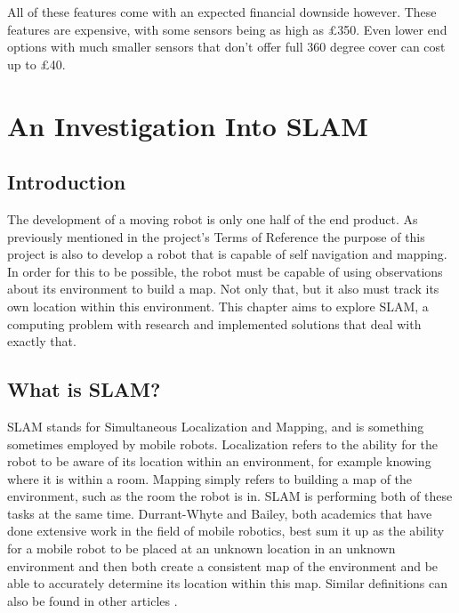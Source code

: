 				All of these features come with an expected financial downside however. These features are expensive, with some sensors being as high as \pounds{350}. Even lower end options with much smaller sensors that don't offer full 360 degree cover can cost up to \pounds{40}.
				
		
		\chapter{An Investigation Into SLAM}
			\section{Introduction}
			The development of a moving robot is only one half of the end product. As previously mentioned in the project's Terms of Reference the purpose of this project is also to develop a robot that is capable of self navigation and mapping. In order for this to be possible, the robot must be capable of using observations about its environment to build a map. Not only that, but it also must track its own location within this environment. This chapter aims to explore SLAM, a computing problem with research and implemented solutions that deal with exactly that.
		
			\section{What is SLAM?}
			SLAM stands for Simultaneous Localization and Mapping, and is something sometimes employed by mobile robots. Localization refers to the ability for the robot to be aware of its location within an environment, for example knowing where it is within a room. Mapping simply refers to building a map of the environment, such as the room the robot is in. SLAM is performing both of these tasks at the same time. Durrant-Whyte and Bailey\citep{durrant2006simultaneous}, both academics that have done extensive work in the field of mobile robotics, best sum it up as the ability for a mobile robot to be placed at an unknown location in an unknown environment and then both create a consistent map of the environment and be able to accurately determine its location within this map. Similar definitions can also be found in other articles \citep{choset2001topological, dissanayake2001solution}.
		
